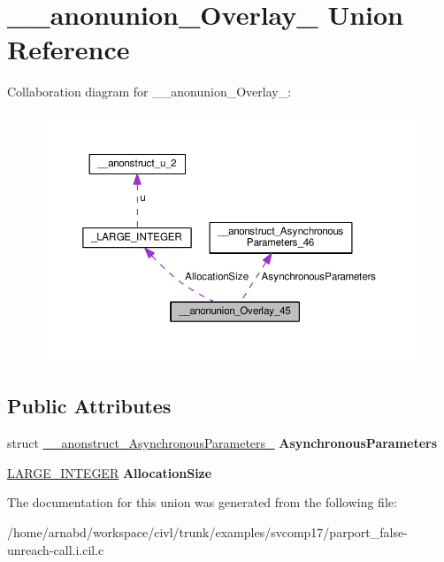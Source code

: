 \hypertarget{union____anonunion__Overlay__45}{}\section{\+\_\+\+\_\+anonunion\+\_\+\+Overlay\+\_ Union Reference}
\label{union____anonunion__Overlay__45}


Collaboration diagram for \+\_\+\+\_\+anonunion\+\_\+\+Overlay\+\_\+:
\nopagebreak
\begin{figure}[H]
\begin{center}
\leavevmode
\includegraphics[width=350pt]{union____anonunion__Overlay__45__coll__graph}
\end{center}
\end{figure}
\subsection*{Public Attributes}
\begin{DoxyCompactItemize}
\item 
\hypertarget{union____anonunion__Overlay__45_af06c7fef238dbdbcd481103e74f0d0fe}{}struct \hyperlink{struct____anonstruct__AsynchronousParameters__46}{\+\_\+\+\_\+anonstruct\+\_\+\+Asynchronous\+Parameters\+\_} {\bfseries Asynchronous\+Parameters}\label{union____anonunion__Overlay__45_af06c7fef238dbdbcd481103e74f0d0fe}

\item 
\hypertarget{union____anonunion__Overlay__45_a9f08eef1b16df830e5a2074abab403a8}{}\hyperlink{union__LARGE__INTEGER}{L\+A\+R\+G\+E\+\_\+\+I\+N\+T\+E\+G\+E\+R} {\bfseries Allocation\+Size}\label{union____anonunion__Overlay__45_a9f08eef1b16df830e5a2074abab403a8}

\end{DoxyCompactItemize}


The documentation for this union was generated from the following file\+:\begin{DoxyCompactItemize}
\item 
/home/arnabd/workspace/civl/trunk/examples/svcomp17/parport\+\_\+false-\/unreach-\/call.\+i.\+cil.\+c\end{DoxyCompactItemize}
